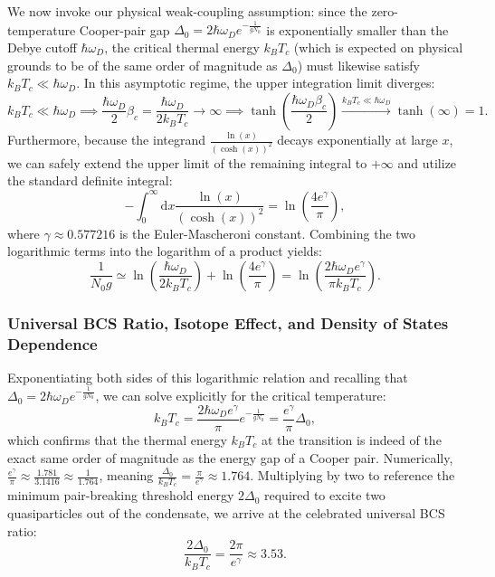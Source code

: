 We now invoke our physical weak-coupling assumption: since the zero-temperature Cooper-pair gap \( \Delta_0 = 2\hbar\omega_D e^{-\frac{1}{gN_0}} \) is exponentially smaller than the Debye cutoff \( \hbar\omega_D \), the critical thermal energy \( k_B T_c \) (which is expected on physical grounds to be of the same order of magnitude as \( \Delta_0 \)) must likewise satisfy \( k_B T_c \ll \hbar\omega_D \). In this asymptotic regime, the upper integration limit diverges:
\[
    k_B T_c \ll \hbar\omega_D \implies \frac{\hbar\omega_D}{2} \beta_c = \frac{\hbar\omega_D}{2k_B T_c} \to \infty \implies \tanh\left( \frac{\hbar\omega_D \beta_c}{2} \right) \xrightarrow{k_B T_c \ll \hbar\omega_D} \tanh(\infty) = 1.
\]
Furthermore, because the integrand \( \frac{\ln(x)}{(\cosh(x))^2} \) decays exponentially at large \( x \), we can safely extend the upper limit of the remaining integral to \( +\infty \) and utilize the standard definite integral:
\[
    -\int_0^\infty \mathrm{d}x \frac{\ln(x)}{(\cosh(x))^2} = \ln\left( \frac{4e^\gamma}{\pi} \right),
\]
where \( \gamma \approx 0.577216 \) is the Euler-Mascheroni constant. Combining the two logarithmic terms into the logarithm of a product yields:
\[
    \frac{1}{N_0 g} \simeq \ln\left( \frac{\hbar\omega_D}{2k_B T_c} \right) + \ln\left( \frac{4e^\gamma}{\pi} \right) = \ln\left( \frac{2\hbar\omega_D e^\gamma}{\pi k_B T_c} \right).
\]

\subsubsection{Universal BCS Ratio, Isotope Effect, and Density of States Dependence}

Exponentiating both sides of this logarithmic relation and recalling that \( \Delta_0 = 2\hbar\omega_D e^{-\frac{1}{gN_0}} \), we can solve explicitly for the critical temperature:
\[
    k_B T_c = \frac{2\hbar\omega_D e^\gamma}{\pi} e^{-\frac{1}{g N_0}} = \frac{e^\gamma}{\pi} \Delta_0,
\]
which confirms that the thermal energy \( k_B T_c \) at the transition is indeed of the exact same order of magnitude as the energy gap of a Cooper pair. Numerically, \( \frac{e^\gamma}{\pi} \approx \frac{1.781}{3.1416} \approx \frac{1}{1.764} \), meaning \( \frac{\Delta_0}{k_B T_c} = \frac{\pi}{e^\gamma} \approx 1.764 \). Multiplying by two to reference the minimum pair-breaking threshold energy \( 2\Delta_0 \) required to excite two quasiparticles out of the condensate, we arrive at the celebrated universal BCS ratio:
\begin{equation} \label{eq:bcs_universal_ratio}
    \frac{2\Delta_0}{k_B T_c} = \frac{2\pi}{e^\gamma} \approx 3.53.
\end{equation}

